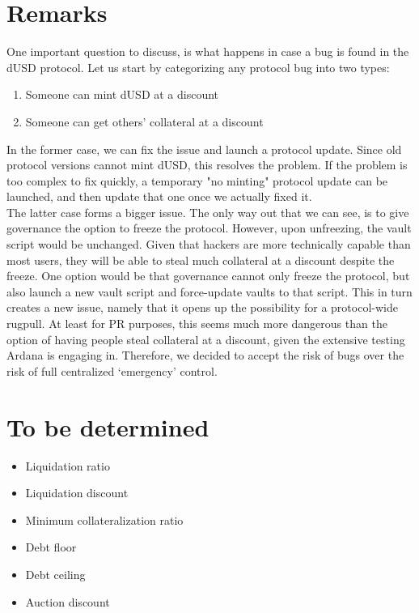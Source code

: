 \documentclass{article} %
\begin{document}
% 

\section{Remarks}

One important question to discuss, is what happens in case a bug is found in the
dUSD protocol.
Let us start by categorizing any protocol bug into two types:
\begin{enumerate}
  \item Someone can mint dUSD at a discount
  \item Someone can get others' collateral at a discount
\end{enumerate}

In the former case, we can fix the issue and launch a protocol update. Since old
protocol versions cannot mint dUSD, this resolves the problem.
If the problem is too complex to fix quickly, a temporary "no minting" protocol
update can be launched, and then update that one once we actually fixed it. \\

The latter case forms a bigger issue.
The only way out that we can see, is to give governance the option to freeze the
protocol.
However, upon unfreezing, the vault script would be unchanged.
Given that hackers are more technically capable than most users, they will be
able to steal much collateral at a discount despite the freeze.
One option would be that governance cannot only freeze the protocol, but also
launch a new vault script and force-update vaults to that script.
This in turn creates a new issue, namely that it opens up the possibility for a
protocol-wide rugpull.
At least for PR purposes, this seems much more dangerous than the option of
having people steal collateral at a discount, given the extensive testing Ardana
is engaging in.
Therefore, we decided to accept the risk of bugs over the risk of full
centralized `emergency' control.

\section{To be determined}

\begin{itemize}
  \item Liquidation ratio
  \item Liquidation discount
  \item Minimum collateralization ratio
  \item Debt floor
  \item Debt ceiling
  \item Auction discount
\end{itemize}
\end{document}
